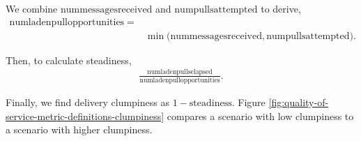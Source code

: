 We combine $\mathrm{num messages received}$ and $\mathrm{num pulls attempted}$ to derive,
\begin{align*}
  \mathrm{num laden pull opportunities} =& \\
   &\min\Big(\mathrm{num messages received}, \mathrm{num pulls attempted}\Big).
\end{align*}

Then, to calculate steadiness,
\begin{align*}
  \frac{
    \mathrm{num laden pulls elapsed}
  }{
    \mathrm{num laden pull opportunities}
  }.
\end{align*}

Finally, we find delivery clumpiness as $1 - \mathrm{steadiness}$.
Figure \ref{fig:quality-of-service-metric-definitions-clumpiness} compares a scenario with low clumpiness to a scenario with higher clumpiness.
